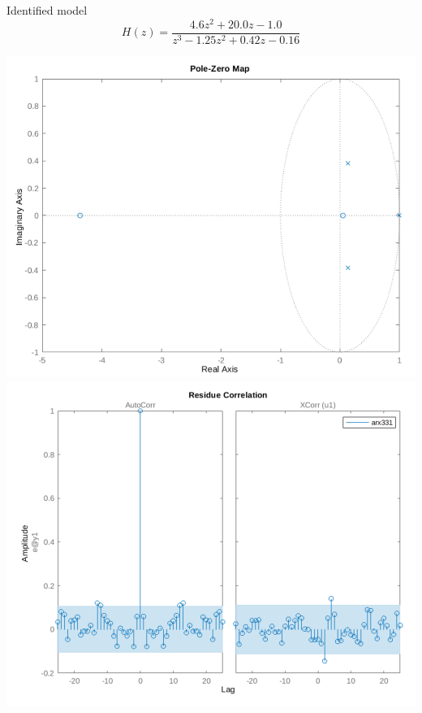 \documentclass[presentation,aspectratio=1610]{beamer}
\begin{document}
\begin{frame}[label={sec:orgf700ceb}]{Identified model}
\[ H(z) = \frac{4.6z^2 + 20.0z -1.0}{z^3 - 1.25z^2 + 0.42z - 0.16}\]

\begin{center}
\includegraphics[width=0.45\linewidth]{../../figures/pmsm_arx331_pzmap.png}
\includegraphics[width=0.45\linewidth]{../../figures/pmsm_arx331_residual.png}
\end{center}
\end{frame}
\end{document}
